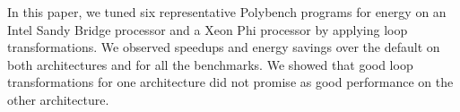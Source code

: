 In this paper, we tuned six representative Polybench programs for energy on
an Intel Sandy Bridge processor and a Xeon Phi processor by applying loop 
transformations. We observed speedups and energy savings over the default
 on both architectures and for all the benchmarks.
We showed that good loop transformations for one architecture did 
not promise as good performance on the other architecture.
